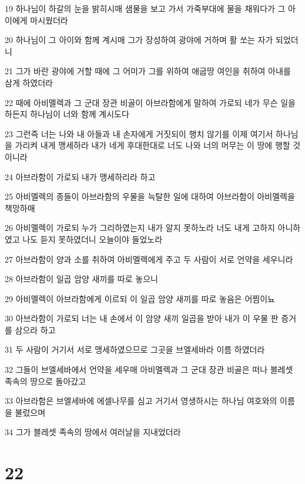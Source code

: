 \par 19 하나님이 하갈의 눈을 밝히시매 샘물을 보고 가서 가죽부대에 물을 채워다가 그 아이에게 마시웠더라
\par 20 하나님이 그 아이와 함께 계시매 그가 장성하여 광야에 거하며 활 쏘는 자가 되었더니
\par 21 그가 바란 광야에 거할 때에 그 어미가 그를 위하여 애굽땅 여인을 취하여 아내를 삼게 하였더라
\par 22 때에 아비멜렉과 그 군대 장관 비골이 아브라함에게 말하여 가로되 네가 무슨 일을 하든지 하나님이 너와 함께 계시도다
\par 23 그런즉 너는 나와 내 아들과 내 손자에게 거짓되이 행치 않기를 이제 여기서 하나님을 가리켜 내게 맹세하라 내가 네게 후대한대로 너도 나와 너의 머무는 이 땅에 행할 것이니라
\par 24 아브라함이 가로되 내가 맹세하리라 하고
\par 25 아비멜렉의 종들이 아브라함의 우물을 늑탈한 일에 대하여 아브라함이 아비멜렉을 책망하매
\par 26 아비멜렉이 가로되 누가 그리하였는지 내가 알지 못하노라 너도 내게 고하지 아니하였고 나도 듣지 못하였더니 오늘이야 들었노라
\par 27 아브라함이 양과 소를 취하여 아비멜렉에게 주고 두 사람이 서로 언약을 세우니라
\par 28 아브라함이 일곱 암양 새끼를 따로 놓으니
\par 29 아비멜렉이 아브라함에게 이르되 이 일곱 암양 새끼를 따로 놓음은 어찜이뇨
\par 30 아브라함이 가로되 너는 내 손에서 이 암양 새끼 일곱을 받아 내가 이 우물 판 증거를 삼으라 하고
\par 31 두 사람이 거기서 서로 맹세하였으므로 그곳을 브엘세바라 이름 하였더라
\par 32 그들이 브엘세바에서 언약을 세우매 아비멜렉과 그 군대 장관 비골은 떠나 블레셋 족속의 땅으로 돌아갔고
\par 33 아브라함은 브엘세바에 에셀나무를 심고 거기서 영생하시는 하나님 여호와의 이름을 불렀으며
\par 34 그가 블레셋 족속의 땅에서 여러날을 지내었더라

\chapter{22}

